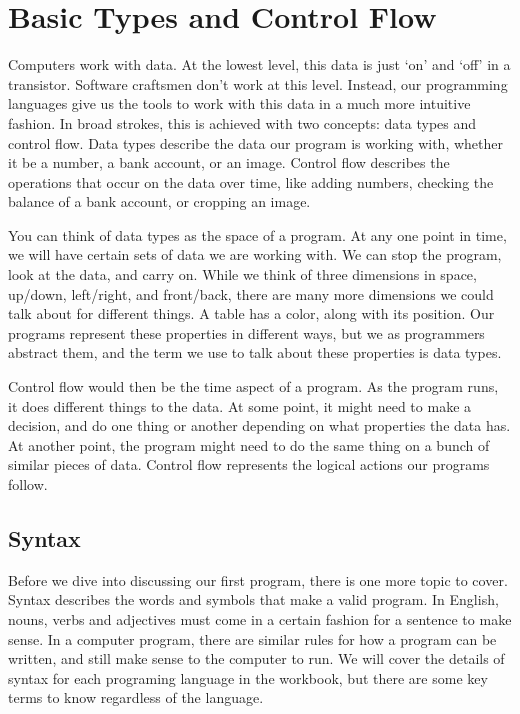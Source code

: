 \chapter{Basic Types and Control Flow}

Computers work with data. At the lowest level, this data is just `on' and
`off' in a transistor. Software craftsmen don't work at this level. Instead,
our programming languages give us the tools to work with this data in a much
more intuitive fashion. In broad strokes, this is achieved with two concepts:
data types and control flow. Data types describe the data our program is
working with, whether it be a number, a bank account, or an image. Control
flow describes the operations that occur on the data over time, like adding
numbers, checking the balance of a bank account, or cropping an image.

You can think of data types as the space of a program. At any one point in
time, we will have certain sets of data we are working with. We can stop the
program, look at the data, and carry on. While we think of three dimensions in
space,  up/down, left/right, and front/back, there are many more dimensions we
could talk about for different things. A table has a color, along with its
position. Our programs represent these properties in different ways, but we as
programmers abstract them, and the term we use to talk about these properties
is data types.

Control flow would then be the time aspect of a program. As the program runs,
it does different things to the data. At some point, it might need to make a
decision, and do one thing or another depending on what properties the data
has. At another point, the program might need to do the same thing on a bunch
of similar pieces of data. Control flow represents the logical actions our
programs follow.

\section{Syntax}

Before we dive into discussing our first program, there is one more topic to
cover. Syntax describes the words and symbols that make a valid program. In
English, nouns, verbs and adjectives must come in a certain fashion for a
sentence to make sense. In a computer program, there are similar rules for how
a program can be written, and still make sense to the computer to run. We will
cover the details of syntax for each programing language in the workbook, but
there are some key terms to know regardless of the language.


